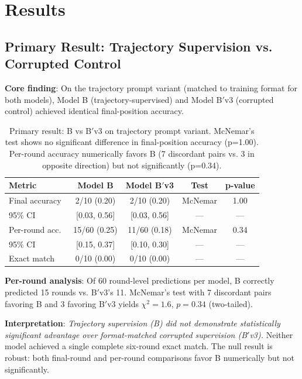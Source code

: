 \section{Results}
\label{sec:results}

\subsection{Primary Result: Trajectory Supervision vs. Corrupted Control}

\textbf{Core finding}: On the trajectory prompt variant (matched to training format for both models), Model B (trajectory-supervised) and Model B$'$v3 (corrupted control) achieved identical final-position accuracy.

\begin{table}[h]
\centering
\begin{tabular}{lcccc}
\toprule
\textbf{Metric} & \textbf{Model B} & \textbf{Model B$'$v3} & \textbf{Test} & \textbf{p-value} \\
\midrule
Final accuracy & 2/10 (0.20) & 2/10 (0.20) & McNemar & 1.00 \\
95\% CI & [0.03, 0.56] & [0.03, 0.56] & --- & --- \\
Per-round acc.~& 15/60 (0.25) & 11/60 (0.18) & McNemar & 0.34 \\
95\% CI & [0.15, 0.37] & [0.10, 0.30] & --- & --- \\
Exact match & 0/10 (0.00) & 0/10 (0.00) & --- & --- \\
\bottomrule
\end{tabular}
\caption{\label{tab:primary} Primary result: B vs B$'$v3 on trajectory prompt variant. McNemar's test shows no significant difference in final-position accuracy (p=1.00). Per-round accuracy numerically favors B (7 discordant pairs vs. 3 in opposite direction) but not significantly (p=0.34).}
\end{table}

\textbf{Per-round analysis}: Of 60 round-level predictions per model, B correctly predicted 15 rounds vs. B$'$v3's 11. McNemar's test with 7 discordant pairs favoring B and 3 favoring B$'$v3 yields $\chi^2 = 1.6$, $p = 0.34$ (two-tailed).

\textbf{Interpretation}: \emph{Trajectory supervision (B) did not demonstrate statistically significant advantage over format-matched corrupted supervision (B$'$v3).} Neither model achieved a single complete six-round exact match. The null result is robust: both final-round and per-round comparisons favor B numerically but not significantly.

